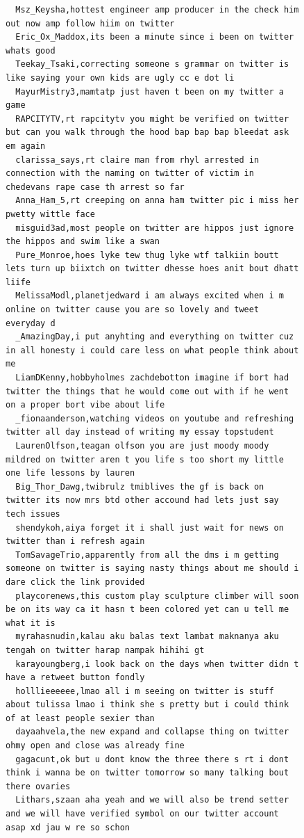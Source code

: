 \begin{figure}[htpb]
\begin{verbatim}
  Msz_Keysha,hottest engineer amp producer in the check him out now amp follow hiim on twitter
  Eric_Ox_Maddox,its been a minute since i been on twitter whats good
  Teekay_Tsaki,correcting someone s grammar on twitter is like saying your own kids are ugly cc e dot li
  MayurMistry3,mamtatp just haven t been on my twitter a game
  RAPCITYTV,rt rapcitytv you might be verified on twitter but can you walk through the hood bap bap bap bleedat ask em again
  clarissa_says,rt claire man from rhyl arrested in connection with the naming on twitter of victim in chedevans rape case th arrest so far
  Anna_Ham_5,rt creeping on anna ham twitter pic i miss her pwetty wittle face
  misguid3ad,most people on twitter are hippos just ignore the hippos and swim like a swan
  Pure_Monroe,hoes lyke tew thug lyke wtf talkiin boutt lets turn up biixtch on twitter dhesse hoes anit bout dhatt liife
  MelissaModl,planetjedward i am always excited when i m online on twitter cause you are so lovely and tweet everyday d
  _AmazingDay,i put anyhting and everything on twitter cuz in all honesty i could care less on what people think about me
  LiamDKenny,hobbyholmes zachdebotton imagine if bort had twitter the things that he would come out with if he went on a proper bort vibe about life
  _fionaanderson,watching videos on youtube and refreshing twitter all day instead of writing my essay topstudent
  LaurenOlfson,teagan olfson you are just moody moody mildred on twitter aren t you life s too short my little one life lessons by lauren
  Big_Thor_Dawg,twibrulz tmiblives the gf is back on twitter its now mrs btd other accound had lets just say tech issues
  shendykoh,aiya forget it i shall just wait for news on twitter than i refresh again
  TomSavageTrio,apparently from all the dms i m getting someone on twitter is saying nasty things about me should i dare click the link provided
  playcorenews,this custom play sculpture climber will soon be on its way ca it hasn t been colored yet can u tell me what it is
  myrahasnudin,kalau aku balas text lambat maknanya aku tengah on twitter harap nampak hihihi gt
  karayoungberg,i look back on the days when twitter didn t have a retweet button fondly
  holllieeeeee,lmao all i m seeing on twitter is stuff about tulissa lmao i think she s pretty but i could think of at least people sexier than
  dayaahvela,the new expand and collapse thing on twitter ohmy open and close was already fine
  gagacunt,ok but u dont know the three there s rt i dont think i wanna be on twitter tomorrow so many talking bout there ovaries
  Lithars,szaan aha yeah and we will also be trend setter and we will have verified symbol on our twitter account asap xd jau w re so schon

\end{verbatim}
\end{figure}
